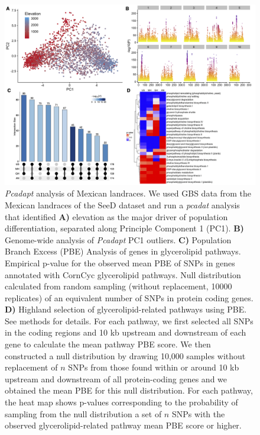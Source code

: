 \documentclass[9pt,twocolumn,twoside,lineno]{biorxiv}
\begin{document}
\begin{figure}[t]
\begin{center}
\includegraphics[width=0.9\paperwidth]{Sup_Figures/Sup_Fig_1.png}
\caption{\textit{Pcadapt} analysis of Mexican landraces. We used GBS data from the Mexican landraces of the SeeD dataset \cite{Romero_Navarro2017-cn} and run a \textit{pcadat} analysis \cite{Luu2017-ws} that identified \textbf{A)} elevation as the major driver of population differentiation, separated along Principle Component 1 (PC1).  
\textbf{B)} Genome-wide analysis of \textit{Pcadapt} PC1 outliers. 
\textbf{C)} Population Branch Excess (PBE) Analysis of genes in glycerolipid pathways.
Empirical p-value for the observed mean PBE of SNPs in genes annotated with CornCyc glycerolipid pathways. Null distribution calculated from random sampling (without replacement, 10000 replicates) of an equivalent number of SNPs in protein coding genes.
\textbf{D)} Highland selection of glycerolipid-related pathways using PBE. See methods for details.
For each pathway, we first selected all SNPs in the coding regions and 10 kb upstream and downstream of each gene to calculate the mean pathway PBE score. 
We then constructed a null distribution by drawing 10,000 samples without replacement of $n$ SNPs from those found within or around 10 kb upstream and downstream of all protein-coding genes and we obtained the mean PBE for this null distribution. 
For each pathway, the heat map shows p-values corresponding to the probability of sampling from the null distribution a set of $n$ SNPs with the observed glycerolipid-related pathway mean PBE score or higher. 
}
\label{SupFig1}
\end{center}
\end{figure} 
\end{document}
